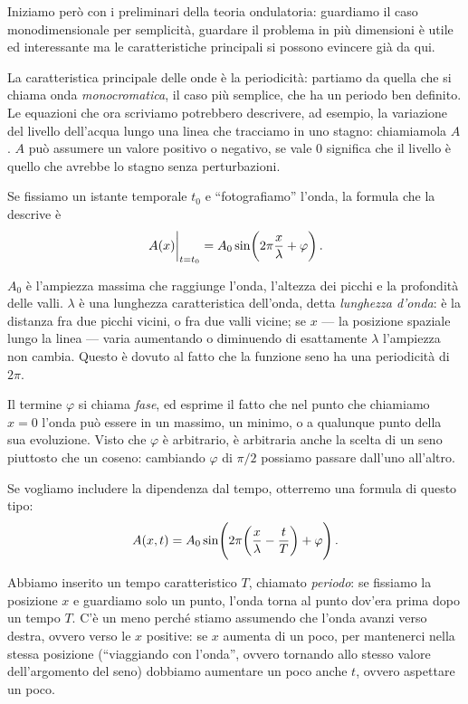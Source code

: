 \documentclass[a4paper,12pt]{article}
\begin{document}
Iniziamo però con i preliminari della teoria ondulatoria: guardiamo il caso monodimensionale per semplicità, guardare il problema in più dimensioni è utile ed interessante ma le caratteristiche principali si possono evincere già da qui. 

La caratteristica principale delle onde è la periodicità: partiamo da quella che si chiama onda \emph{monocromatica}, il caso più semplice, che ha un periodo ben definito.
Le equazioni che ora scriviamo potrebbero descrivere, ad esempio, la variazione del livello dell'acqua lungo una linea che tracciamo in uno stagno: chiamiamola \(A\).
\(A\) può assumere un valore positivo o negativo, se vale 0 significa che il livello è quello che avrebbe lo stagno senza perturbazioni.

Se fissiamo un istante temporale \(t_0 \) e ``fotografiamo'' l'onda, la formula che la descrive è 
%
\begin{align}
\eval{A(x)}_{t = t_0 } = A_0 \sin(2 \pi \frac{x}{\lambda } +\varphi )
\,.
\end{align}

\(A_0 \) è l'ampiezza massima che raggiunge l'onda, l'altezza dei picchi e la profondità delle valli. \(\lambda \) è una lunghezza caratteristica dell'onda, detta \emph{lunghezza d'onda}: è la distanza fra due picchi vicini, o fra due valli vicine; se \(x\) --- la posizione spaziale lungo la linea --- varia aumentando o diminuendo di esattamente \(\lambda\) l'ampiezza non cambia.
Questo è dovuto al fatto che la funzione seno ha una periodicità di \(2 \pi \). 

Il termine \(\varphi \) si chiama \emph{fase}, ed esprime il fatto che nel punto che chiamiamo \(x=0\) l'onda può essere in un massimo, un minimo, o a qualunque punto della sua evoluzione. 
Visto che \(\varphi \) è arbitrario, è arbitraria anche la scelta di un seno piuttosto che un coseno: cambiando \(\varphi \) di \(\pi /2\) possiamo passare dall'uno all'altro. 

Se vogliamo includere la dipendenza dal tempo, otterremo una formula di questo tipo: 
%
\begin{align}
A(x, t) = A_0 \sin(2 \pi \qty( \frac{x}{\lambda } - \frac{t}{T}) + \varphi )
\,.
\end{align}

Abbiamo inserito un tempo caratteristico \(T\), chiamato \emph{periodo}: se fissiamo la posizione \(x\) e guardiamo solo un punto, l'onda torna al punto dov'era prima dopo un tempo \(T\). 
C'è un meno perché stiamo assumendo che l'onda avanzi verso destra, ovvero verso le \(x\) positive: se \(x\) aumenta di un poco, per mantenerci nella stessa posizione (``viaggiando con l'onda'', ovvero tornando allo stesso valore dell'argomento del seno) dobbiamo aumentare un poco anche \(t\), ovvero aspettare un poco. 
\end{document}
